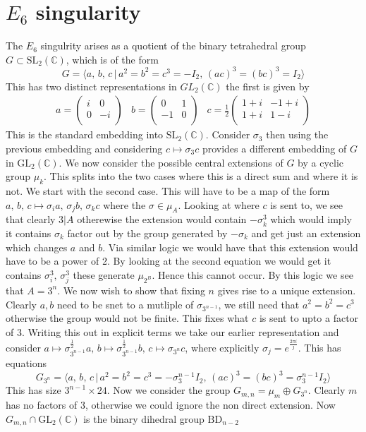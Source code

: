 \documentclass[11pt]{report}
\theoremstyle{definition}
\theoremstyle{definition}
\theoremstyle{definition}
\theoremstyle{definition}
\theoremstyle{definition}
\theoremstyle{definition}
\theoremstyle{definition}
\theoremstyle{definition}
\newcommand{\spl}{\text{SL}_2 (\mathbb{C})}
\newcommand{\gl}{\text{GL}_2 (\mathbb{C})}
\begin{document}
 

\section{ $E_6$ singularity}

The $E_6$ singulrity arises as a quotient of the binary tetrahedral group $G \subset \text{SL}_2(\mathbb{C})$, which is of the form 
\[
G = \langle a, \, b, \, c\,  | \, a^2 = b^2 = c^3 = - I_2, \, (ac)^3 = (bc)^3 = I_2 \rangle 
\]
This has two distinct representations in $GL_2(\mathbb{C})$ the first is given by 
\[
\begin{array}{ccc}
a = \left(
\begin{array}{cc}
i & 0  \\
0 & -i \\
\end{array} \right) &
b = \left(
\begin{array}{cc}
0 & 1  \\
-1 & 0 \\
\end{array} \right) &c = \frac{1}{2} \left(
\begin{array}{cc}
1+i & -1 + i  \\
1+i & 1-i \\
\end{array} \right) 
\end{array}
\]
This is the standard embedding into $\spl$. Consider $\sigma_3$ then using the previous embedding and considering $c \mapsto \sigma_3 c$ provides a different embedding of $G$ in $\gl$. We now consider the possible central extensions of $G$ by a cyclic group $\mu_k$. This splits into the two cases where this is a direct sum and where it is not. We start with the second case. This will have to be a map of the form $a, \, b, \, c \mapsto \sigma_i a, \, \sigma_j b , \, \sigma_k c$ where the $\sigma \in \mu_A$. Looking at where $c$ is sent to, we see that clearly $3|A$ otherewise the extension would contain $-\sigma_k^3$ which would imply it contains $\sigma_k$ factor out by the group generated by $-\sigma_k$ and get just an extension which changes $a$ and $b$. Via similar logic we would have that this extension would have to be a power of 2. By looking at the second equation we would get it contains $\sigma_i ^ 3, \, \sigma_j^3$ these generate $\mu_{2^B}$. Hence this cannot occur. By this logic we see that $A = 3^n$. We now wish to show that fixing $n$ gives rise to a unique extension. Clearly $a, b$ need to be snet to a mutliple of $\sigma_{3^{n-1}}$, we still need that $a^2 = b^2 = c^3$ otherwise the group would not be finite. This fixes what $c$ is sent to upto a factor of 3. Writing this out in explicit terms we take our earlier representation and consider $a \mapsto \sigma_{3^{n-1}}^{\frac{1}{2}} a, \, b \mapsto \sigma_{3^{n-1}} ^{\frac{1}{2}} b, \, c \mapsto \sigma_{3^n} c$, where explicitly $\sigma_j = e^\frac{2\pi i }{j}$. This has equations 
\[ G_{3^n} = \langle  a, \, b, \, c\,  | \, a^2 = b^2 = c^3 = - \sigma_3^{n-1} I_2, \, (ac)^3 = (bc)^3 = \sigma_3^{n-1} I_2 \rangle \]
This has size $3^{n-1} \times 24$. Now we consider the group $G_{m,n} = \mu_m \oplus G_{3^n}$. Clearly $m$ has no factors of 3, otherwise we could ignore the non direct extension. Now $G_{m, n} \cap \gl$ is the binary dihedral group $\text{BD}_{n-2}$
 
\end{document}
